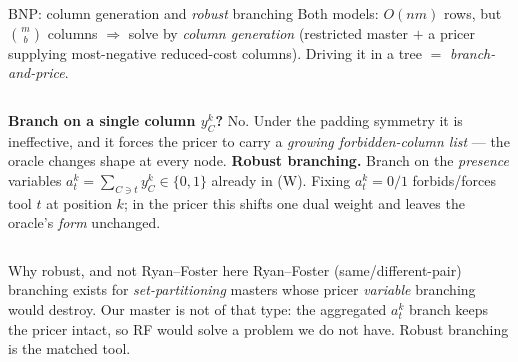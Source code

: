 \documentclass[10pt]{beamer}
\newcommand{\good}[1]{\textcolor{tight}{#1}}
\newcommand{\bad}[1]{\textcolor{acc}{#1}}
\begin{document}
\begin{frame}{BNP: column generation and \emph{robust} branching}
Both models: $O(nm)$ rows, but $\binom{m}{b}$ columns $\Rightarrow$ solve by
\emph{column generation} (restricted master $+$ a pricer supplying most-negative
reduced-cost columns). Driving it in a tree $=$ \emph{branch-and-price}.
\begin{columns}[T]
\textbf{Branch on a single column $y_C^{k}$?} \bad{No.} Under the padding symmetry it is
ineffective, and it forces the pricer to carry a \emph{growing forbidden-column list} ---
the oracle changes shape at every node.
\textbf{Robust branching.} Branch on the \emph{presence} variables
$a_t^{k}=\sum_{C\ni t}y_C^{k}\in\{0,1\}$ already in (W). Fixing $a_t^{k}=0/1$ forbids/forces
tool $t$ at position $k$; in the pricer this \good{shifts one dual weight} and leaves the
oracle's \emph{form} unchanged.
\end{columns}
\vspace{1.5mm}
\begin{block}{Why robust, and not Ryan--Foster here}
Ryan--Foster (same/different-pair) branching exists for \emph{set-partitioning} masters
whose pricer \emph{variable} branching would destroy. Our master is not of that type: the
aggregated $a_t^{k}$ branch keeps the pricer intact, so \good{RF would solve a problem we
do not have}. Robust branching is the matched tool.
\end{block}
\end{frame}
\end{document}
